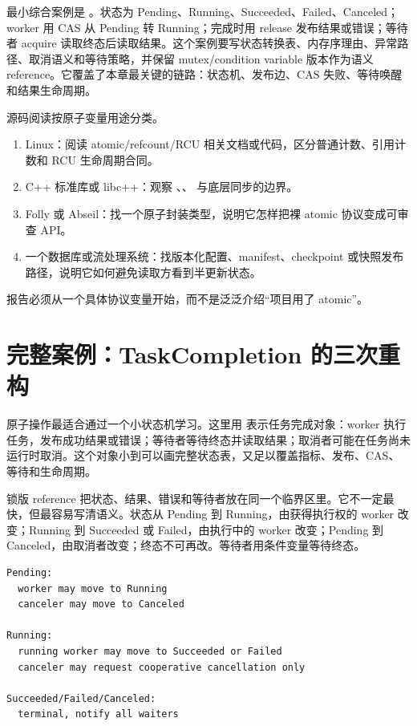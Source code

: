最小综合案例是 。状态为 Pending、Running、Succeeded、Failed、Canceled；worker 用 CAS 从 Pending 转 Running；完成时用 release 发布结果或错误；等待者 acquire 读取终态后读取结果。这个案例要写状态转换表、内存序理由、异常路径、取消语义和等待策略，并保留 mutex/condition variable 版本作为语义 reference。它覆盖了本章最关键的链路：状态机、发布边、CAS 失败、等待唤醒和结果生命周期。

\begin{sourcereadingbox}
源码阅读按原子变量用途分类。
\begin{enumerate}
  \item Linux：阅读 atomic/refcount/RCU 相关文档或代码，区分普通计数、引用计数和 RCU 生命周期合同。
  \item C++ 标准库或 libc++：观察 、、 与底层同步的边界。
  \item Folly 或 Abseil：找一个原子封装类型，说明它怎样把裸 atomic 协议变成可审查 API。
  \item 一个数据库或流处理系统：找版本化配置、manifest、checkpoint 或快照发布路径，说明它如何避免读取方看到半更新状态。
\end{enumerate}
报告必须从一个具体协议变量开始，而不是泛泛介绍“项目用了 atomic”。
\end{sourcereadingbox}

\section{完整案例：TaskCompletion 的三次重构}

原子操作最适合通过一个小状态机学习。这里用  表示任务完成对象：worker 执行任务，发布成功结果或错误；等待者等待终态并读取结果；取消者可能在任务尚未运行时取消。这个对象小到可以画完整状态表，又足以覆盖指标、发布、CAS、等待和生命周期。

锁版 reference 把状态、结果、错误和等待者放在同一个临界区里。它不一定最快，但最容易写清语义。状态从 Pending 到 Running，由获得执行权的 worker 改变；Running 到 Succeeded 或 Failed，由执行中的 worker 改变；Pending 到 Canceled，由取消者改变；终态不可再改。等待者用条件变量等待终态。

\begin{lstlisting}[numbers=none,caption={锁版 completion 的状态机}]
Pending:
  worker may move to Running
  canceler may move to Canceled

Running:
  running worker may move to Succeeded or Failed
  canceler may request cooperative cancellation only

Succeeded/Failed/Canceled:
  terminal, notify all waiters
\end{lstlisting}

